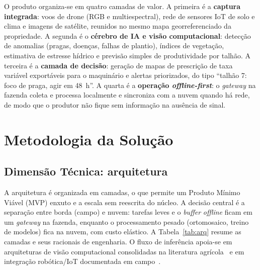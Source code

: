 \documentclass[conference]{IEEEtran}
\begin{document}
O produto organiza-se em quatro camadas de valor. A primeira é a \textbf{captura integrada}: voos de drone (RGB e multiespectral), rede de sensores IoT de solo e clima e imagens de satélite, reunidos no mesmo mapa georreferenciado da propriedade. A segunda é o \textbf{cérebro de IA e visão computacional}: detecção de anomalias (pragas, doenças, falhas de plantio), índices de vegetação, estimativa de estresse hídrico e previsão simples de produtividade por talhão. A terceira é a \textbf{camada de decisão}: geração de mapas de prescrição de taxa variável exportáveis para o maquinário e alertas priorizados, do tipo ``talhão 7: foco de praga, agir em 48~h''. A quarta é a \textbf{operação \textit{offline-first}}: o \textit{gateway} na fazenda coleta e processa localmente e sincroniza com a nuvem quando há rede, de modo que o produtor não fique sem informação na ausência de sinal.

\section{Metodologia da Solução}

\subsection{Dimensão Técnica: arquitetura}
A arquitetura é organizada em camadas, o que permite um Produto Mínimo Viável (MVP) enxuto e a escala sem reescrita do núcleo. A decisão central é a separação entre borda (campo) e nuvem: tarefas leves e o \textit{buffer} \textit{offline} ficam em um \textit{gateway} na fazenda, enquanto o processamento pesado (ortomosaico, treino de modelos) fica na nuvem, com custo elástico. A Tabela~\ref{tab:arq} resume as camadas e seus racionais de engenharia. O fluxo de inferência apoia-se em arquiteturas de visão computacional consolidadas na literatura agrícola~\cite{embrapa_vc,sbc_vc,artigo_efficientnet} e em integração robótica/IoT documentada em campo~\cite{durmus_iot,sodebras}.
\end{document}
